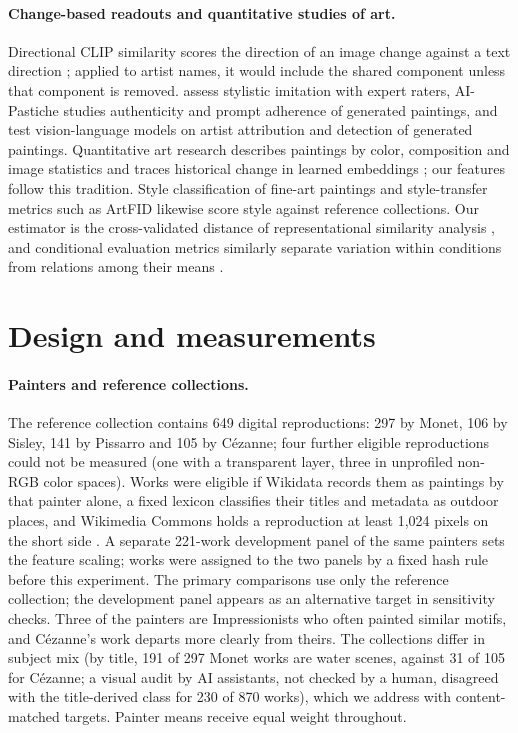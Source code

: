 \documentclass[10pt]{article}
\begin{document}
\paragraph{Change-based readouts and quantitative studies of art.}
Directional CLIP similarity scores the direction of an image change against a text direction
\citep{gal2022stylegannada,brooks2023instructpix2pix}; applied to artist names, it would include
the shared component unless that component is removed. \citet{deliege2025} assess stylistic
imitation with expert raters, AI-Pastiche \citep{asperti2025pastiche} studies authenticity and
prompt adherence of generated paintings, and \citet{fu2025aiwikiart} test vision-language models
on artist attribution and detection of generated paintings. Quantitative art research describes
paintings by color, composition and image statistics \citep{kim2014,sigaki2018,lee2020} and
traces historical change in learned embeddings \citep{kim2026}; our features follow this
tradition. Style classification of fine-art paintings \citep{karayev2014recognizing,saleh2016large}
and style-transfer metrics such as ArtFID \citep{wright2022artfid} likewise score style against
reference collections. Our estimator is the cross-validated distance of representational similarity analysis
\citep{diedrichsen2017representational}, and conditional evaluation metrics similarly separate
variation within conditions from relations among their means \citep{benny2021conditional}.

\section{Design and measurements}\label{sec:design}

\paragraph{Painters and reference collections.}
The reference collection contains 649 digital reproductions: 297 by Monet, 106 by Sisley, 141 by
Pissarro and 105 by C\'ezanne; four further eligible reproductions could not be measured (one with
a transparent layer, three in unprofiled non-RGB color spaces). Works were eligible if Wikidata records them as paintings by that
painter alone, a fixed lexicon classifies their titles and metadata as outdoor places, and
Wikimedia Commons holds a reproduction at least 1,024 pixels on the short side
\citep{wikimediacommons,vrandecic2014wikidata}. A separate 221-work development panel of the same
painters sets the feature scaling; works were assigned to the two panels by a fixed hash rule
before this experiment. The primary comparisons use only the reference collection; the
development panel appears as an alternative target in sensitivity checks. Three of the painters
are Impressionists who often painted similar motifs, and C\'ezanne's work departs more clearly
from theirs. The collections differ in subject mix (by title, 191 of 297 Monet works are water
scenes, against 31 of 105 for C\'ezanne; a visual audit by AI assistants, not checked by a human,
disagreed with the title-derived class for 230 of 870 works), which we address with
content-matched targets. Painter means receive equal weight throughout.
\end{document}
